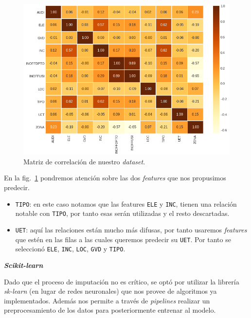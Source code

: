 \documentclass[a4paper,12pt]{article}
\begin{document}
		\begin{figure}[H]
			\begin{center}
				\includegraphics[width=1\textwidth]{corrmatrix.png}
				\caption{Matriz de correlación de nuestro \textit{dataset}.}
				\label{fig:corrmatrix}
			\end{center}
		\end{figure}
				
		En la fig.~\ref{fig:corrmatrix} pondremos atención sobre las dos \textit{features} que nos propusimos predecir.
				
		\begin{itemize}[noitemsep, topsep=2pt]
			\item \texttt{TIPO}: en este caso notamos que las features \texttt{ELE} y \texttt{INC}, tienen una relación notable con \texttt{TIPO}, por tanto esas serán utilizadas y el resto descartadas.
			\item \texttt{UET}: aquí las relaciones están mucho más difusas, por tanto usaremos \textit{features} que estén en las filas a las cuales queremos predecir su \texttt{UET}. Por tanto se seleccionó \texttt{ELE}, \texttt{INC}, \texttt{LOC}, \texttt{GVD} y \texttt{TIPO}.
		\end{itemize}
				
		\textbf{\textit{Scikit-learn}}
				
		Dado que el proceso de imputación no es crítico, se optó por utilizar la librería \textit{sk-learn} (en lugar de redes neuronales) que nos provee de algoritmos ya implementados. Además nos permite a través de \textit{pipelines} realizar un preprocesamiento de los datos para posteriormente entrenar al modelo.
				
\end{document}
